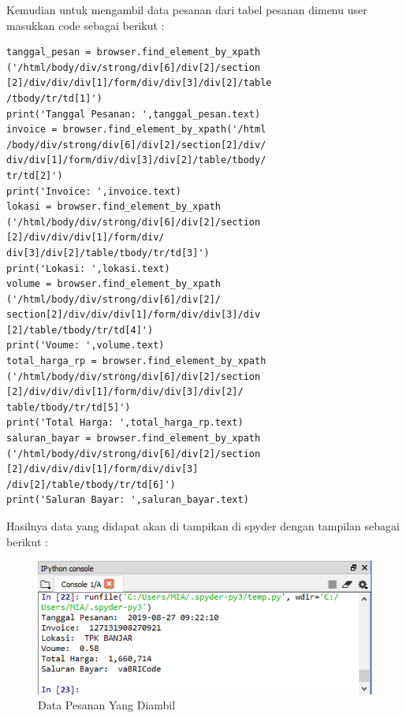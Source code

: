 Kemudian untuk mengambil data pesanan dari tabel pesanan dimenu user masukkan code sebagai berikut :
\begin{verbatim}
tanggal_pesan = browser.find_element_by_xpath
('/html/body/div/strong/div[6]/div[2]/section
[2]/div/div/div[1]/form/div/div[3]/div[2]/table
/tbody/tr/td[1]')
print('Tanggal Pesanan: ',tanggal_pesan.text)
invoice = browser.find_element_by_xpath('/html
/body/div/strong/div[6]/div[2]/section[2]/div/
div/div[1]/form/div/div[3]/div[2]/table/tbody/
tr/td[2]')
print('Invoice: ',invoice.text)
lokasi = browser.find_element_by_xpath
('/html/body/div/strong/div[6]/div[2]/section
[2]/div/div/div[1]/form/div/
div[3]/div[2]/table/tbody/tr/td[3]')
print('Lokasi: ',lokasi.text)
volume = browser.find_element_by_xpath
('/html/body/div/strong/div[6]/div[2]/
section[2]/div/div/div[1]/form/div/div[3]/div
[2]/table/tbody/tr/td[4]')
print('Voume: ',volume.text)
total_harga_rp = browser.find_element_by_xpath
('/html/body/div/strong/div[6]/div[2]/section
[2]/div/div/div[1]/form/div/div[3]/div[2]/
table/tbody/tr/td[5]')
print('Total Harga: ',total_harga_rp.text)
saluran_bayar = browser.find_element_by_xpath
('/html/body/div/strong/div[6]/div[2]/section
[2]/div/div/div[1]/form/div/div[3]
/div[2]/table/tbody/tr/td[6]')
print('Saluran Bayar: ',saluran_bayar.text)
\end{verbatim}
Hasilnya data yang didapat akan di tampikan di spyder dengan tampilan sebagai berikut :
\begin{figure}[h]
	\centering
	\includegraphics[scale=0.6]{figures/mengambildatapesanan}
	\caption{Data Pesanan Yang Diambil}
\end{figure}

\newpage

